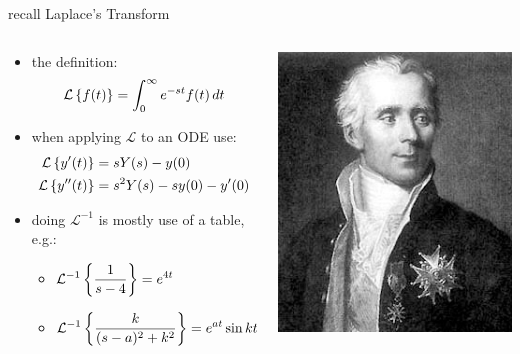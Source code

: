 \documentclass[dvipsnames,colorlinks]{beamer}
\begin{document}
\begin{frame}{recall Laplace's Transform}

\begin{columns}
\begin{column}{0.77\textwidth}
\begin{itemize}
\item the definition:
    $$\mathcal{L}\left\{f(t)\right\} = \int_0^\infty e^{-st} f(t)\,dt$$
\item when applying $\mathcal{L}$ to an ODE use:
\begin{align*}
\mathcal{L}\left\{y'(t)\right\} &= s Y(s) - y(0) \\
\mathcal{L}\left\{y''(t)\right\} &= s^2 Y(s) - s y(0) - y'(0)
\end{align*}
\item doing $\mathcal{L}^{-1}$ is mostly use of a table, e.g.:
    \begin{itemize}
    \item $\displaystyle \mathcal{L}^{-1}\left\{\frac{1}{s-4}\right\} = e^{4t}$
    \item $\displaystyle \mathcal{L}^{-1}\left\{\frac{k}{(s-a)^2+k^2}\right\} = e^{at} \sin{kt}$
    \end{itemize}
\end{itemize}
\end{column}
\begin{column}{0.23\textwidth}
\includegraphics[width=\textwidth]{figs/Laplace-sharp}


\end{column}
\end{columns}
\end{frame}
\end{document}
